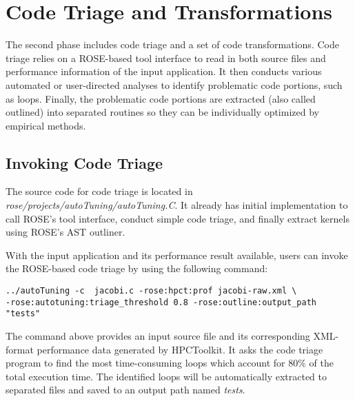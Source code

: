 \section{Code Triage and Transformations}
The second phase includes code triage and a set of code transformations. 
Code triage relies on a ROSE-based tool interface to read in both source files and performance information of
the input application.
It then conducts various automated or user-directed analyses to identify problematic code portions, such as loops. 
Finally, the problematic code portions are extracted (also called outlined) into separated routines so they can be individually
optimized by empirical methods. 


\subsection{Invoking Code Triage}
The source code for code triage is located in
\textit{rose/projects/autoTuning/autoTuning.C}. 
It already has initial implementation to call ROSE's tool interface,
conduct simple code triage, and finally extract kernels using ROSE's AST
outliner. 

With the input application and its performance result available, users can
invoke the ROSE-based code triage by using the following command:
\begin{verbatim}
../autoTuning -c  jacobi.c -rose:hpct:prof jacobi-raw.xml \
-rose:autotuning:triage_threshold 0.8 -rose:outline:output_path "tests"
\end{verbatim}
The command above provides an input source file and its corresponding XML-format performance data generated by HPCToolkit.
It asks the code triage program to find the most time-consuming 
loops which account for 80\% of the total execution time. 
The identified loops will be automatically extracted to separated files and saved to an output path named \textit{tests}.

